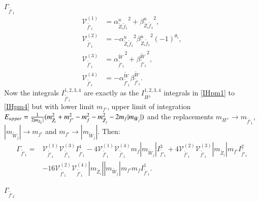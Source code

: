 \documentclass[final,3p,times]{elsarticle}
\begin{document}
\textbf{\underline{$\Gamma_{\tilde{f'}_1}$}}
\begin{align}
\mathcal{V}_{\tilde{f'}_1}^{(1)} &= {\alpha_{\tilde{Z}_i \tilde{f}_1}^{u}}^2 + {\beta_{\tilde{Z}_i \tilde{f}_1}^{u}}^2, \\
\mathcal{V}_{\tilde{f'}_1}^{(2)} &= -{\alpha_{\tilde{Z}_i \tilde{f}_1}^{u}}^2 {\beta_{\tilde{Z}_i \tilde{f}_1}^{u}}^2 (-1)^{\theta_i}, \\
\mathcal{V}_{\tilde{f'}_1}^{(3)} &= {\alpha_{\tilde{f'}_1}^{\tilde{W}}}^2 + {\beta_{\tilde{f'}_1}^{\tilde{W}}}^2, \\
\mathcal{V}_{\tilde{f'}_1}^{(4)} &= -\alpha_{\tilde{f'}_1}^{\tilde{W}} \beta_{\tilde{f'}_1}^{\tilde{W}}.
\end{align}
Now the integrals $I_{\tilde{f'}_1}^{1,2,3,4}$ are exactly as the $I_{H^{\pm}}^{1,2,3,4}$ integrals in \eqref{IHpm1} to \eqref{IHpm4} but with lower limit $m_{f'}$, upper limit of integration $E_{upper} = {1 \over 2|m_{\tilde{Z}_1}|}(m_{\tilde{Z}_i}^2 + m_{f'}^2 - m_{f}^2 - m_{\tilde{Z}_j}^2 -2 m_{f}|m_{\tilde{W}_j}|)$ and the replacements $m_{H^{\pm}} \rightarrow m_{\tilde{f'}_1}$, $|m_{\tilde{W}_j}| \rightarrow m_{f'}$ and $m_{f'} \rightarrow |m_{\tilde{W}_j}|$.
Then:
\begin{equation}
\begin{aligned}
\Gamma_{\tilde{f'}_1} = & \mathcal{V}_{\tilde{f'}_1}^{(1)} \mathcal{V}_{\tilde{f'}_1}^{(3)} I_{\tilde{f'}_1}^{4} - 4 \mathcal{V}_{\tilde{f'}_1}^{(1)} \mathcal{V}_{\tilde{f'}_1}^{(4)} m_{f}|m_{\tilde{W}_j}| I_{\tilde{f'}_1}^{3} + 4 \mathcal{V}_{\tilde{f'}_1}^{(2)} \mathcal{V}_{\tilde{f'}_1}^{(3)} |m_{\tilde{Z}_i}|m_{f'} I_{\tilde{f'}_1}^{2} \\ & - 16 \mathcal{V}_{\tilde{f'}_1}^{(2)} \mathcal{V}_{\tilde{f'}_1}^{(4)} |m_{\tilde{Z}_i}||m_{\tilde{W}_j}|m_{f'}m_{f} I_{\tilde{f'}_1}^{1}.
\end{aligned}
\end{equation}

\textbf{\underline{$\Gamma_{\tilde{f'}_2}$}}
\end{document}

